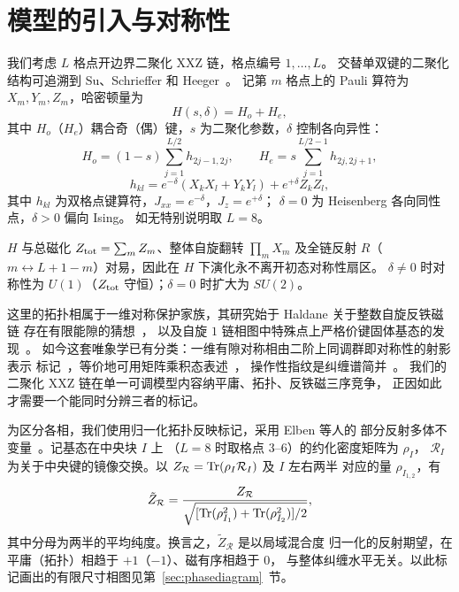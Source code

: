 \section{模型的引入与对称性}
\label{sec:model}

我们考虑 $L$ 格点开边界二聚化 XXZ 链，格点编号 $1,\dots,L$。
交替单双键的二聚化结构可追溯到 Su、Schrieffer 和
Heeger~\cite{su1979solitons}。
记第 $m$ 格点上的 Pauli 算符为 $X_m,Y_m,Z_m$，哈密顿量为
\begin{equation}
H(s,\delta)=H_o+H_e,
\end{equation}
其中 $H_o$（$H_e$）耦合奇（偶）键，$s$ 为二聚化参数，$\delta$ 控制各向异性：
\begin{equation}
H_o=(1-s)\sum_{j=1}^{L/2}h_{2j-1,2j},\qquad
H_e=s\sum_{j=1}^{L/2-1}h_{2j,2j+1},
\end{equation}
\begin{equation}
h_{kl}=e^{-\delta}(X_kX_l+Y_kY_l)+e^{+\delta}Z_kZ_l,
\end{equation}
其中 $h_{kl}$ 为双格点键算符，$J_{xx}=e^{-\delta}$，$J_{z}=e^{+\delta}$；
$\delta=0$ 为 Heisenberg 各向同性点，$\delta>0$ 偏向 Ising。
如无特别说明取 $L=8$。

$H$ 与总磁化 $Z_{\rm tot}=\sum_m Z_m$、整体自旋翻转 $\prod_m X_m$ 及全链反射
$R$（$m\leftrightarrow L+1-m$）对易，因此在 $H$ 下演化永不离开初态对称性扇区。
$\delta\ne0$ 时对称性为 $U(1)$（$Z_{\rm tot}$ 守恒）；$\delta=0$ 时扩大为 $SU(2)$。

这里的拓扑相属于一维对称保护家族，其研究始于 Haldane 关于整数自旋反铁磁链
存在有限能隙的猜想~\cite{haldane1983nonlinear,dennijs1989preroughening}，
以及自旋 $1$ 链相图中特殊点上严格价键固体基态的发现~\cite{affleck1987rigorous,dennijs1989preroughening}。
如今这套唯象学已有分类：一维有隙对称相由二阶上同调群即对称性的射影表示
标记~\cite{chen2011classification}，等价地可用矩阵乘积态表述~\cite{schuch2011classifying}，
操作性指纹是纠缠谱简并~\cite{pollmann2010entanglement,li2008entanglement}。
我们的二聚化 XXZ 链在单一可调模型内容纳平庸、拓扑、反铁磁三序竞争，
正因如此才需要一个能同时分辨三者的标记。

为区分各相，我们使用归一化拓扑反映标记，采用 Elben 等人的
部分反射多体不变量~\cite{elben2020manybody}。记基态在中央块 $I$ 上
（$L=8$ 时取格点 $3$--$6$）的约化密度矩阵为 $\rho_I$，
${\mathcal R}_I$ 为关于中央键的镜像交换。以
$Z_{\mathcal R}={\rm Tr}(\rho_I{\mathcal R}_I)$ 及 $I$ 左右两半
对应的量 $\rho_{I_{1,2}}$，有
\begin{equation}
\tilde{Z}_{\mathcal R}=
\frac{Z_{\mathcal R}}
{\sqrt{[{\rm Tr}(\rho_{I_1}^2)+{\rm Tr}(\rho_{I_2}^2)]/2}},
\end{equation}
其中分母为两半的平均纯度。换言之，$\tilde{Z}_{\mathcal R}$ 是以局域混合度
归一化的反射期望，在平庸（拓扑）相趋于 $+1$（$-1$）、磁有序相趋于 $0$，
与整体纠缠水平无关。以此标记画出的有限尺寸相图见第~\ref{sec:phasediagram}~节。
